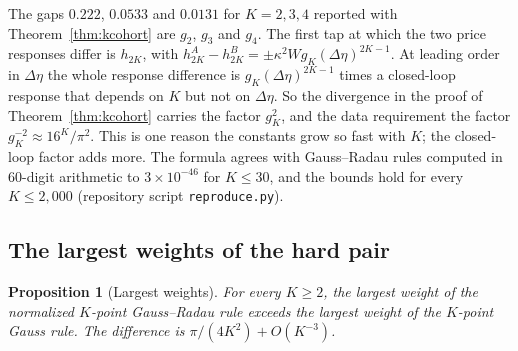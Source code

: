 \documentclass[12pt]{article}
\newtheorem{proposition}[theorem]{Proposition}
\theoremstyle{definition}
\theoremstyle{remark}
\begin{document}
The gaps $0.222$, $0.0533$ and $0.0131$ for $K=2,3,4$ reported with Theorem~\ref{thm:kcohort} are $g_2$, $g_3$ and $g_4$. The first tap at which the two price responses differ is $h_{2K}$, with $h^A_{2K}-h^B_{2K}=\pm\kappa^2Wg_K(\Delta\eta)^{2K-1}$. At leading order in $\Delta\eta$ the whole response difference is $g_K(\Delta\eta)^{2K-1}$ times a closed-loop response that depends on $K$ but not on $\Delta\eta$. So the divergence in the proof of Theorem~\ref{thm:kcohort} carries the factor $g_K^2$, and the data requirement the factor $g_K^{-2}\approx16^K/\pi^2$. This is one reason the constants grow so fast with $K$; the closed-loop factor adds more. The formula agrees with Gauss--Radau rules computed in 60-digit arithmetic to $3\times10^{-46}$ for $K\le30$, and the bounds hold for every $K\le2{,}000$ (repository script \nolinkurl{reproduce.py}).

\subsection{The largest weights of the hard pair}

\begin{proposition}[Largest weights]\label{prop:maxweight}
For every $K\ge2$, the largest weight of the normalized $K$-point Gauss--Radau rule exceeds the largest weight of the $K$-point Gauss rule. The difference is $\pi/(4K^2)+O(K^{-3})$.
\end{proposition}
\end{document}
